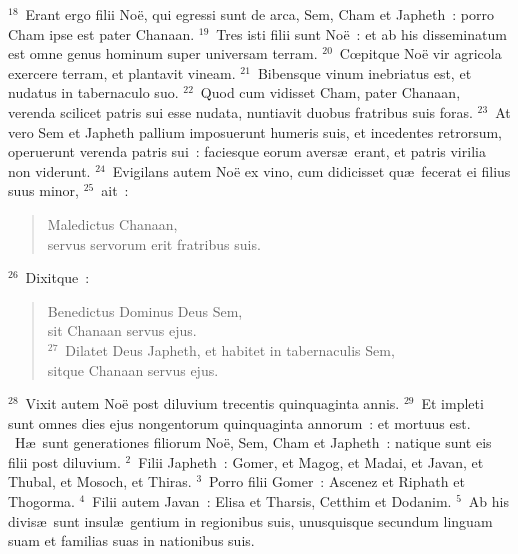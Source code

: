 ${}^{18}$~Erant ergo filii No\"e, qui egressi sunt de arca, Sem, Cham et Japheth~: porro Cham ipse est pater Chanaan.
${}^{19}$~Tres isti filii sunt No\"e~: et ab his disseminatum est omne genus hominum super universam terram.
${}^{20}$~Cœpitque No\"e vir agricola exercere terram, et plantavit vineam.
${}^{21}$~Bibensque vinum inebriatus est, et nudatus in tabernaculo suo.
${}^{22}$~Quod cum vidisset Cham, pater Chanaan, verenda scilicet patris sui esse nudata, nuntiavit duobus fratribus suis foras.
${}^{23}$~At vero Sem et Japheth pallium imposuerunt humeris suis, et incedentes retrorsum, operuerunt verenda patris sui~: faciesque eorum avers\ae\ erant, et patris virilia non viderunt.
${}^{24}$~Evigilans autem No\"e ex vino, cum didicisset qu\ae\ fecerat ei filius suus minor,
${}^{25}$~ait~: \begin{flushleft}\begin{verse}Maledictus Chanaan,\\ servus servorum erit fratribus suis.\end{verse}\end{flushleft}


${}^{26}$~Dixitque~: \begin{flushleft}\begin{verse}Benedictus Dominus Deus Sem,\\ sit Chanaan servus ejus.\\
${}^{27}$~Dilatet Deus Japheth, et habitet in tabernaculis Sem,\\ sitque Chanaan servus ejus.\end{verse}\end{flushleft}


${}^{28}$~Vixit autem No\"e post diluvium trecentis quinquaginta annis.
${}^{29}$~Et impleti sunt omnes dies ejus nongentorum quinquaginta annorum~: et mortuus est.
~H\ae\ sunt generationes filiorum No\"e, Sem, Cham et Japheth~: natique sunt eis filii post diluvium.
${}^{2}$~Filii Japheth~: Gomer, et Magog, et Madai, et Javan, et Thubal, et Mosoch, et Thiras.
${}^{3}$~Porro filii Gomer~: Ascenez et Riphath et Thogorma.
${}^{4}$~Filii autem Javan~: Elisa et Tharsis, Cetthim et Dodanim.
${}^{5}$~Ab his divis\ae\ sunt insul\ae\ gentium in regionibus suis, unusquisque secundum linguam suam et familias suas in nationibus suis.


